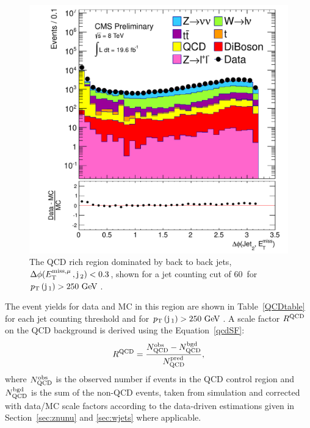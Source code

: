 \begin{figure}[htbp!]
\begin{center}
 \includegraphics[scale=0.4]{Figures/sus13009/dPhi_MetLep_Jet2.pdf}
\caption{The QCD rich region dominated by back to back jets, $\Delta \phi(E^{\rm miss, \mu}_{\rm T}\,, {\rm j}\,_2)<0.3$, shown for a jet counting cut of 60~\GeV for $p_{\text{T}}\,({\rm j}\,_1) > 250~\mathrm{GeV}\,$.}
\label{dphi_METj2}
\end{center}
\end{figure}


The event yields for data and MC in this region are shown in Table~\ref{QCDtable} for each jet counting \pt threshold and for $p_{\text{T}}\,({\rm j}\,_{1})>250~\mathrm{GeV}\,$. 
A scale factor $R^{\rm QCD}$ on the QCD background is derived using the Equation~\ref{qcdSF}:
\begin{equation}
\label{qcdSF}
R^{\rm QCD} = \frac{ N^{\rm obs}_{\rm QCD} - N^{\rm bgd}_{\rm QCD} }{ N^{\rm pred}_{\rm QCD} },
\end{equation}
where $N^{\rm obs}_{\rm QCD}$ is the observed number if events in the QCD control region and $N^{\rm bgd}_{\rm QCD}$ is the sum of the non-QCD events, taken from simulation and corrected with data/MC scale factors according to the data-driven estimations given in Section~\ref{sec:znunu} and \ref{sec:wjets} where applicable.


